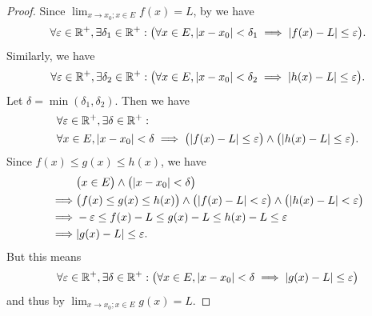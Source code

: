 \begin{proof}
  Since \(\lim_{x \to x_0 ; x \in E} f(x) = L\), by  we have
  \[
    \forall \varepsilon \in \mathbb{R}^+, \exists \delta_1 \in \mathbb{R}^+ : \big(\forall x \in E, \left\lvert x - x_0\right\rvert < \delta_1 \implies \left\lvert f(x) - L\right\rvert \leq \varepsilon\big).
  \]
  Similarly, we have
  \[
    \forall \varepsilon \in \mathbb{R}^+, \exists \delta_2 \in \mathbb{R}^+ : \big(\forall x \in E, \left\lvert x - x_0\right\rvert < \delta_2 \implies \left\lvert h(x) - L\right\rvert \leq \varepsilon\big).
  \]
  Let \(\delta = \min(\delta_1, \delta_2)\).
  Then we have
  \begin{align*}
     & \forall \varepsilon \in \R^+, \exists \delta \in \R^+ :                                                                                     \\
     & \forall x \in E, \abs{x - x_0} < \delta \implies \big(\abs{f(x) - L} \leq \varepsilon\big) \land \big(\abs{h(x) - L} \leq \varepsilon\big).
  \end{align*}
  Since \(f(x) \leq g(x) \leq h(x)\), we have
  \begin{align*}
             & \big(x \in E\big) \land \big(\abs{x - x_0} < \delta\big)                                                                     \\
    \implies & \big(f(x) \leq g(x) \leq h(x)\big) \land \big(\abs{f(x) - L} < \varepsilon\big) \land \big(\abs{h(x) - L} < \varepsilon\big) \\
    \implies & -\varepsilon \leq f(x) - L \leq g(x) - L \leq h(x) - L \leq \varepsilon                                                      \\
    \implies & \abs{g(x) - L} \leq \varepsilon.
  \end{align*}
  But this means
  \[
    \forall \varepsilon \in \mathbb{R}^+, \exists \delta \in \mathbb{R}^+ : \big(\forall x \in E, \left\lvert x - x_0\right\rvert < \delta \implies \left\lvert g(x) - L\right\rvert \leq \varepsilon\big)
  \]
  and thus by  \(\lim_{x \to x_0 ; x \in E} g(x) = L\).
\end{proof}
